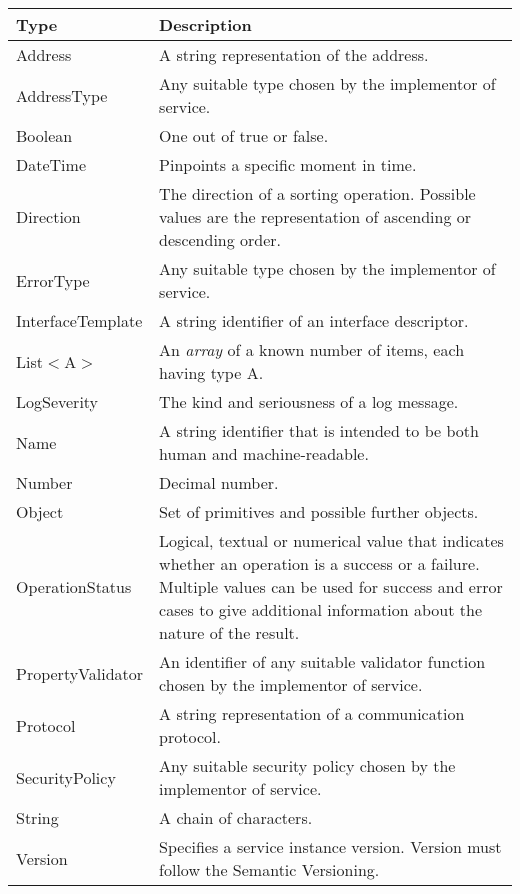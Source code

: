 \documentclass[a4paper]{arrowhead}
\newcommand{\pdef}[1]{{\textcolor{ArrowheadGrey}{#1\label{sec:model:primitives:#1}\label{sec:model:primitives:#1s}\label{sec:model:primitives:#1es}}}}
\begin{document}
\begin{table}[ht!]
\begin{tabularx}{\textwidth}{| p{3cm} | X |} \hline
\rowcolor{gray!33} Type & Description \\ \hline
\pdef{Address}          & A string representation of the address. \\ \hline
\pdef{AddressType}      & Any suitable type chosen by the implementor of service. \\ \hline
\pdef{Boolean}          & One out of true or false. \\ \hline
\pdef{DateTime}         & Pinpoints a specific moment in time. \\ \hline
\pdef{Direction}        & The direction of a sorting operation. Possible values are the representation of ascending or descending order. \\ \hline
\pdef{ErrorType}        & Any suitable type chosen by the implementor of service. \\ \hline
\pdef{InterfaceTemplate} & A string identifier of an interface descriptor. \\ \hline
\pdef{List}$<$A$>$      & An \textit{array} of a known number of items, each having type A. \\ \hline
\pdef{LogSeverity}      & The kind and seriousness of a log message. \\ \hline
\pdef{Name}             & A string identifier that is intended to be both human and machine-readable. \\ \hline
\pdef{Number}           & Decimal number. \\ \hline
\pdef{Object}           & Set of primitives and possible further objects. \\ \hline
\pdef{OperationStatus}  & Logical, textual or numerical value that indicates whether an operation is a success or a failure. Multiple values can be used for success and error cases to give additional information about the nature of the result. \\ \hline
\pdef{PropertyValidator} & An identifier of any suitable validator function chosen by the implementor of service. \\ \hline
\pdef{Protocol}         & A string representation of a communication protocol. \\ \hline
\pdef{SecurityPolicy}   & Any suitable security policy chosen by the implementor of service. \\ \hline
\pdef{String}           & A chain of characters. \\ \hline
\pdef{Version}          & Specifies a service instance version. Version must follow the Semantic Versioning. \\ \hline
\end{tabularx}
\end{table}
\end{document}
